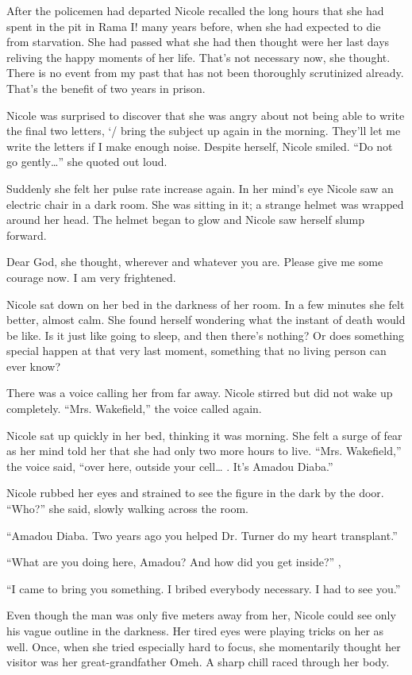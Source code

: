 \documentclass[]{article}
\begin{document}
{{After the policemen had departed Nicole recalled the long hours that she had spent in the pit in Rama I! many years before, when she had expected to die from starvation. She had passed what she had then thought were her last days reliving the happy moments of her life. That’s not necessary now, she thought. There is no event from my past that has not been thoroughly scrutinized already. That’s the benefit of two years in prison.

Nicole was surprised to discover that she was angry about not being able to write the final two letters, ‘/ bring the subject up again in the morning. They’ll let me write the letters if I make enough noise. Despite herself, Nicole smiled. “Do not go gently…” she quoted out loud.

Suddenly she felt her pulse rate increase again. In her mind’s eye Nicole saw an electric chair in a dark room. She was sitting in it; a strange helmet was wrapped around her head. The helmet began to glow and Nicole saw herself slump forward.

Dear God, she thought, wherever and whatever you are. Please give me some courage now. I am very frightened.

Nicole sat down on her bed in the darkness of her room. In a few minutes she felt better, almost calm. She found herself wondering what the instant of death would be like. Is it just like going to sleep, and then there’s nothing? Or does something special happen at that very last moment, something that no living person can ever know?

There was a voice calling her from far away. Nicole stirred but did not wake up completely. “Mrs. Wakefield,” the voice called again.

Nicole sat up quickly in her bed, thinking it was morning. She felt a surge of fear as her mind told her that she had only two more hours to live. “Mrs. Wakefield,” the voice said, “over here, outside your cell… . It’s Amadou Diaba.”

Nicole rubbed her eyes and strained to see the figure in the dark by the door. “Who?” she said, slowly walking across the room.

“Amadou Diaba. Two years ago you helped Dr. Turner do my heart transplant.”

“What are you doing here, Amadou? And how did you get inside?” ,

“I came to bring you something. I bribed everybody necessary. I had to see you.”

Even though the man was only five meters away from her, Nicole could see only his vague outline in the darkness. Her tired eyes were playing tricks on her as well. Once, when she tried especially hard to focus, she momentarily thought her visitor was her great-grandfather Omeh. A sharp chill raced through her body.

}}
\end{document}

